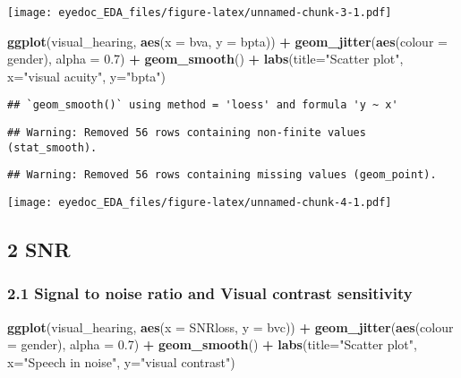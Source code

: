 \documentclass[]{article}
\newenvironment{Shaded}{\begin{snugshade}}{\end{snugshade}}
\newcommand{\DataTypeTok}[1]{\textcolor[rgb]{0.13,0.29,0.53}{#1}}
\newcommand{\FloatTok}[1]{\textcolor[rgb]{0.00,0.00,0.81}{#1}}
\newcommand{\KeywordTok}[1]{\textcolor[rgb]{0.13,0.29,0.53}{\textbf{#1}}}
\newcommand{\NormalTok}[1]{#1}
\newcommand{\OperatorTok}[1]{\textcolor[rgb]{0.81,0.36,0.00}{\textbf{#1}}}
\newcommand{\StringTok}[1]{\textcolor[rgb]{0.31,0.60,0.02}{#1}}
\begin{document}
\texttt{[image: eyedoc\_EDA\_files/figure-latex/unnamed-chunk-3-1.pdf]}

\begin{Shaded}
\begin{Highlighting}[]
\KeywordTok{ggplot}\NormalTok{(visual_hearing, }\KeywordTok{aes}\NormalTok{(}\DataTypeTok{x =}\NormalTok{ bva, }\DataTypeTok{y =}\NormalTok{ bpta)) }\OperatorTok{+}
\StringTok{    }\KeywordTok{geom_jitter}\NormalTok{(}\KeywordTok{aes}\NormalTok{(}\DataTypeTok{colour =}\NormalTok{ gender), }\DataTypeTok{alpha =} \FloatTok{0.7}\NormalTok{) }\OperatorTok{+}
\StringTok{    }\KeywordTok{geom_smooth}\NormalTok{() }\OperatorTok{+}
\StringTok{    }\KeywordTok{labs}\NormalTok{(}\DataTypeTok{title=}\StringTok{"Scatter plot"}\NormalTok{, }\DataTypeTok{x=}\StringTok{"visual acuity"}\NormalTok{, }\DataTypeTok{y=}\StringTok{"bpta"}\NormalTok{)}
\end{Highlighting}
\end{Shaded}

\begin{verbatim}
## `geom_smooth()` using method = 'loess' and formula 'y ~ x'
\end{verbatim}

\begin{verbatim}
## Warning: Removed 56 rows containing non-finite values (stat_smooth).
\end{verbatim}

\begin{verbatim}
## Warning: Removed 56 rows containing missing values (geom_point).
\end{verbatim}

\texttt{[image: eyedoc\_EDA\_files/figure-latex/unnamed-chunk-4-1.pdf]}

\hypertarget{snr}{%
\subsection{2 SNR}\label{snr}}

\hypertarget{signal-to-noise-ratio-and-visual-contrast-sensitivity}{%
\subsubsection{2.1 Signal to noise ratio and Visual contrast
sensitivity}\label{signal-to-noise-ratio-and-visual-contrast-sensitivity}}

\begin{Shaded}
\begin{Highlighting}[]
\KeywordTok{ggplot}\NormalTok{(visual_hearing, }\KeywordTok{aes}\NormalTok{(}\DataTypeTok{x =}\NormalTok{ SNRloss, }\DataTypeTok{y =}\NormalTok{ bvc)) }\OperatorTok{+}
\StringTok{    }\KeywordTok{geom_jitter}\NormalTok{(}\KeywordTok{aes}\NormalTok{(}\DataTypeTok{colour =}\NormalTok{ gender), }\DataTypeTok{alpha =} \FloatTok{0.7}\NormalTok{) }\OperatorTok{+}
\StringTok{    }\KeywordTok{geom_smooth}\NormalTok{() }\OperatorTok{+}
\StringTok{    }\KeywordTok{labs}\NormalTok{(}\DataTypeTok{title=}\StringTok{"Scatter plot"}\NormalTok{, }\DataTypeTok{x=}\StringTok{"Speech in noise"}\NormalTok{, }\DataTypeTok{y=}\StringTok{"visual contrast"}\NormalTok{)}
\end{Highlighting}
\end{Shaded}
\end{document}
